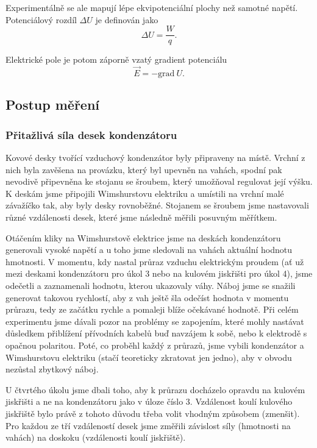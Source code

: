 \documentclass[english]{article}
\begin{document}
		Experimentálně se ale mapují lépe ekvipotenciální plochy než samotné napětí. Potenciálový rozdíl $\Delta U$ je definován jako
		\begin{equation}
		\Delta U = \frac{W}{q}.
		\end{equation}
		
		Elektrické pole je potom záporně vzatý gradient potenciálu
		\begin{equation}
		\vec{E} = - \text{grad}\ U.
		\end{equation}
		
		
	\subsection{Postup měření}
						
		\subsubsection{Přitažlivá síla desek kondenzátoru}
				Kovové desky tvořící vzduchový kondenzátor byly připraveny na místě. Vrchní z nich byla zavěšena na provázku, který byl upevněn na vahách, spodní pak nevodivě připevněna ke stojanu se šroubem, který umožňoval regulovat její výšku. K deskám jsme připojili Wimshurstovu elektriku a umístili na vrchní malé závažíčko tak, aby byly desky rovnoběžné. Stojanem se šroubem jsme nastavovali různé vzdálenosti desek, které jsme následně měřili posuvným měřítkem. 
				
				Otáčením kliky na Wimshurstově elektrice jsme na deskách kondenzátoru generovali vysoké napětí a u toho jsme sledovali na vahách aktuální hodnotu hmotnosti. V momentu, kdy nastal průraz vzduchu elektrickým proudem (ať už mezi deskami kondenzátoru pro úkol 3 nebo na kulovém jiskřišti pro úkol 4), jsme odečetli a zaznamenali hodnotu, kterou ukazovaly váhy. Náboj jsme se snažili generovat takovou rychlostí, aby z vah ještě šla odečíst hodnota v momentu průrazu, tedy ze začátku rychle a pomaleji blíže očekávané hodnotě. Při celém experimentu jsme dávali pozor na problémy se zapojením, které mohly nastávat důsledkem přiblížení přívodních kabelů buď navzájem k sobě, nebo k elektrodě s opačnou polaritou. 
				Poté, co proběhl každý z průrazů, jsme vybili kondenzátor a Wimshurstovu elektriku (stačí teoreticky zkratovat jen jedno), aby v obvodu nezůstal zbytkový náboj.
				
				U čtvrtého úkolu jsme dbali toho, aby k průrazu docházelo opravdu na kulovém jiskřišti a ne na kondenzátoru jako v úloze číslo 3. Vzdálenost koulí kulového jiskřiště bylo právě z tohoto důvodu třeba volit vhodným způsobem (zmenšit). Pro každou ze tří vzdáleností desek jsme změřili závislost síly (hmotnosti na vahách) na doskoku (vzdálenosti koulí jiskřiště).
		
\end{document}
